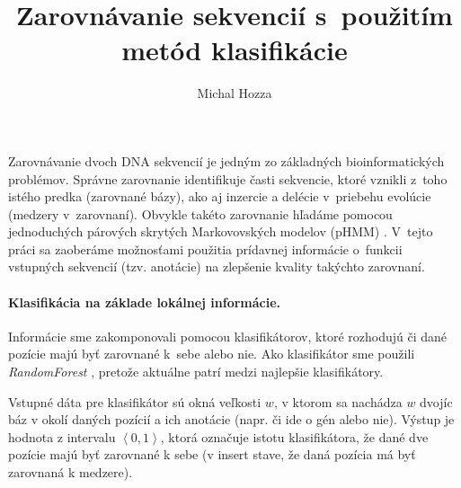 \documentclass{svk_short_sk}
\begin{document}
\title{Zarovnávanie sekvencií s~použitím metód klasifikácie}

\author{Michal Hozza
}




\maketitle

Zarovnávanie dvoch DNA sekvencií je jedným zo základných
bioinformatických problémov. Správne zarovnanie identifikuje časti
sekvencie, ktoré vznikli z~toho istého predka (zarovnané bázy), ako aj
inzercie a delécie v~priebehu evolúcie (medzery v~zarovnaní). Obvykle
takéto zarovnanie hľadáme pomocou jednoduchých párových skrytých
Markovovských modelov (pHMM) \cite{durbin}. V~tejto práci sa zaoberáme
možnosťami použitia prídavnej informácie o~funkcii vstupných sekvencií
(tzv. anotácie) na zlepšenie kvality takýchto zarovnaní.

\paragraph{Klasifikácia na základe lokálnej informácie.}

Informácie sme zakomponovali pomocou klasifikátorov, ktoré rozhodujú či dané pozície majú byť zarovnané k~sebe alebo nie. Ako klasifikátor sme použili \emph{RandomForest} \cite{randomForestPaper}, pretože aktuálne patrí medzi najlepšie klasifikátory.

Vstupné dáta pre klasifikátor sú okná veľkosti $w$, v ktorom sa nachádza $w$ dvojíc báz v okolí daných pozícií a ich anotácie (napr. či ide o gén alebo nie). Výstup je hodnota z intervalu $\left<0,1\right>$, ktorá označuje istotu klasifikátora, že dané dve pozície majú byť zarovnané k sebe (v insert stave, že daná pozícia má byť zarovnaná k medzere).
\end{document}
